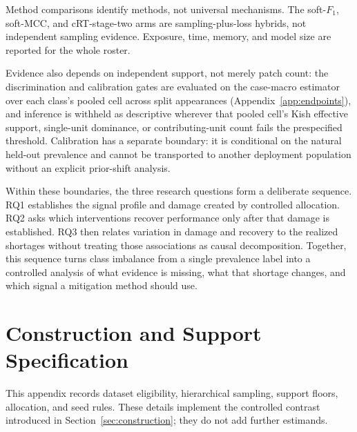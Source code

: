 \documentclass[11pt]{article}
\begin{document}
Method comparisons identify methods, not universal mechanisms. The soft-$F_1$, soft-MCC, and cRT-stage-two arms are sampling-plus-loss hybrids, not independent sampling evidence. Exposure, time, memory, and model size are reported for the whole roster.

Evidence also depends on independent support, not merely patch count: the discrimination and calibration gates are evaluated on the case-macro estimator over each class's pooled cell across split appearances (Appendix~\ref{app:endpoints}), and inference is withheld as descriptive wherever that pooled cell's Kish effective support, single-unit dominance, or contributing-unit count fails the prespecified threshold. Calibration has a separate boundary: it is conditional on the natural held-out prevalence and cannot be transported to another deployment population without an explicit prior-shift analysis.

Within these boundaries, the three research questions form a deliberate sequence. RQ1 establishes the signal profile and damage created by controlled allocation. RQ2 asks which interventions recover performance only after that damage is established. RQ3 then relates variation in damage and recovery to the realized shortages without treating those associations as causal decomposition. Together, this sequence turns class imbalance from a single prevalence label into a controlled analysis of what evidence is missing, what that shortage changes, and which signal a mitigation method should use.

\clearpage
\appendix
{}
{}
\section{Construction and Support Specification}
\label{app:construction}
This appendix records dataset eligibility, hierarchical sampling, support floors, allocation, and seed rules. These details implement the controlled contrast introduced in Section~\ref{sec:construction}; they do not add further estimands.
\end{document}
